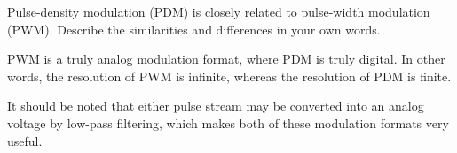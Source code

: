 

Pulse-density modulation (PDM) is closely related to pulse-width modulation (PWM).  Describe the similarities and differences in your own words.







PWM is a truly analog modulation format, where PDM is truly digital.  In other words, the resolution of PWM is infinite, whereas the resolution of PDM is finite.







It should be noted that either pulse stream may be converted into an analog voltage by low-pass filtering, which makes both of these modulation formats very useful.




